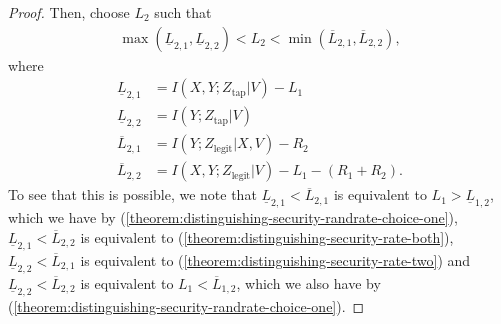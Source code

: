 \documentclass[journal]{IEEEtran}
\newcommand{\codebookRateOne}{R_1}
\newcommand{\codebookRateTwo}{R_2}
\newcommand{\channelInOne}{X}
\newcommand{\channelInTwo}{Y}
\newcommand{\channelOut}{Z}
\newcommand{\channelOutWiretapper}{\channelOut_\mathrm{tap}}
\newcommand{\channelOutLegit}{\channelOut_\mathrm{legit}}
\newcommand{\mutualInformationConditional}[3]{I(#1;#2|#3)}
\newcommand{\codebookRandRateOne}{{L_1}}
\newcommand{\codebookRandRateTwo}{{L_2}}
\newcommand{\codebookRandRateOneLower}[1]{{\underline{L}_{1,{#1}}}}
\newcommand{\codebookRandRateOneUpper}[1]{{\overline{L}_{1,{#1}}}}
\newcommand{\codebookRandRateTwoLower}[1]{{\underline{L}_{2,{#1}}}}
\newcommand{\codebookRandRateTwoUpper}[1]{{\overline{L}_{2,{#1}}}}
\newcommand{\timeSharingRV}{V}
\begin{document}
\begin{proof}
Then, choose $\codebookRandRateTwo$ such that
\begin{align}
\label{theorem:distinguishing-security-randrate-choice-two}
\max(\codebookRandRateTwoLower{1}, \codebookRandRateTwoLower{2})
< \codebookRandRateTwo <
\min(\codebookRandRateTwoUpper{1}, \codebookRandRateTwoUpper{2}),
\end{align}
where
\begin{align*}
\codebookRandRateTwoLower{1} &= \mutualInformationConditional{\channelInOne,\channelInTwo}{\channelOutWiretapper}{\timeSharingRV} - \codebookRandRateOne
\\
\codebookRandRateTwoLower{2}
&=
\mutualInformationConditional{\channelInTwo}{\channelOutWiretapper}{\timeSharingRV}
\\
\codebookRandRateTwoUpper{1} &= \mutualInformationConditional{\channelInTwo}{\channelOutLegit}{\channelInOne,\timeSharingRV} - \codebookRateTwo
\\
\codebookRandRateTwoUpper{2}
&=
\mutualInformationConditional{\channelInOne, \channelInTwo}{\channelOutLegit}{\timeSharingRV} - \codebookRandRateOne - (\codebookRateOne + \codebookRateTwo).
\end{align*}
To see that this is possible, we note that $\codebookRandRateTwoLower{1} < \codebookRandRateTwoUpper{1}$ is equivalent to $\codebookRandRateOne > \codebookRandRateOneLower{2}$, which we have by (\ref{theorem:distinguishing-security-randrate-choice-one}), $\codebookRandRateTwoLower{1} < \codebookRandRateTwoUpper{2}$ is equivalent to (\ref{theorem:distinguishing-security-rate-both}), $\codebookRandRateTwoLower{2} < \codebookRandRateTwoUpper{1}$ is equivalent to (\ref{theorem:distinguishing-security-rate-two}) and $\codebookRandRateTwoLower{2} < \codebookRandRateTwoUpper{2}$ is equivalent to $\codebookRandRateOne < \codebookRandRateOneUpper{2}$, which we also have by (\ref{theorem:distinguishing-security-randrate-choice-one}).


\end{proof}
\end{document}
